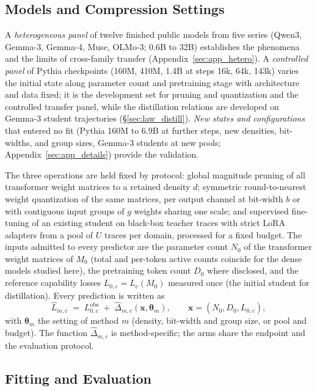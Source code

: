 \subsection{Models and Compression Settings}
\label{sec:models}

A \emph{heterogeneous panel} of twelve finished public models from
five series (Qwen3, Gemma-3, Gemma-4, Muse, OLMo-3; 0.6B to 32B)
establishes the phenomena and the limits of cross-family transfer
(Appendix~\ref{sec:app_hetero}). A \emph{controlled panel} of Pythia checkpoints
\citep{biderman2023pythia} (160M, 410M, 1.4B at steps 16k, 64k, 143k) varies the
initial state along parameter count and pretraining stage with
architecture and data fixed; it is the development set for pruning and quantization and the controlled transfer panel, while the distillation relations are developed on Gemma-3 student trajectories (\S\ref{sec:law_distill}). \emph{New states and configurations} that entered no fit (Pythia
160M to 6.9B at further steps, new densities, bit-widths, and group
sizes, Gemma-3 students at new pools; Appendix~\ref{sec:app_details})
provide the validation.

The three operations are held fixed by protocol: global magnitude
pruning of all transformer weight matrices to a retained density $d$;
symmetric round-to-nearest weight quantization of the same matrices,
per output channel at bit-width $b$ or with contiguous input groups of
$g$ weights sharing one scale;
and supervised fine-tuning of an existing student on black-box
teacher traces with strict LoRA adapters \citep{hu2022lora} from a
pool of $U$ traces per domain, processed for a fixed budget. The inputs admitted to every predictor are the parameter count $N_0$
of the transformer weight matrices of $M_0$ (total and per-token
active counts coincide for the dense models studied here), the
pretraining token count $D_0$ where disclosed, and the reference
capability losses $L_{0,c}=L_c(M_0)$ measured once (the initial
student for distillation). Every prediction is written as
\begin{equation}
\widehat L_{m,c}\;=\;L^{\mathrm{obs}}_{0,c}\;+\;
\widehat\Delta_{m,c}(\mathbf x,\boldsymbol\theta_m),\qquad
\mathbf x=(N_0,D_0,L_{0,c}),
\label{eq:interface}
\end{equation}
with $\boldsymbol\theta_m$ the setting of method $m$ (density,
bit-width and group size, or pool and budget). The function $\widehat\Delta_{m,c}$ is method-specific; the arms
share the endpoint and the evaluation protocol.

\subsection{Fitting and Evaluation}
\label{sec:eval}


